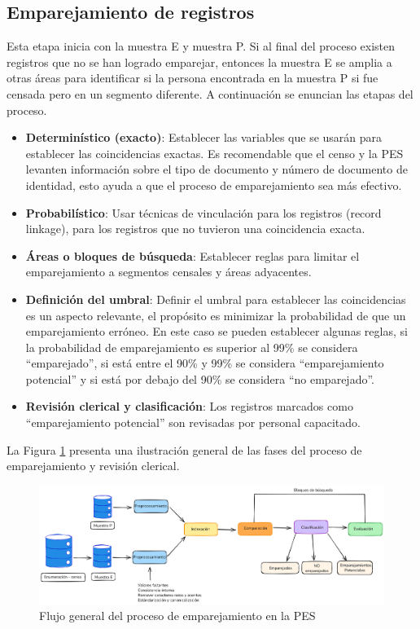 \documentclass[
  12pt,
]{book}
\providecommand{\tightlist}{%
  \setlength{\itemsep}{0pt}\setlength{\parskip}{0pt}}
\begin{document}
\subsection{Emparejamiento de registros}\label{emparejamiento-de-registros}

Esta etapa inicia con la muestra E y muestra P. Si al final del proceso existen registros que no se han logrado emparejar, entonces la muestra E se amplia a otras áreas para identificar si la persona encontrada en la muestra P si fue censada pero en un segmento diferente. A continuación se enuncian las etapas del proceso.

\begin{itemize}
\tightlist
\item
  \textbf{Determinístico (exacto)}: Establecer las variables que se usarán para establecer las coincidencias exactas. Es recomendable que el censo y la PES levanten información sobre el tipo de documento y número de documento de identidad, esto ayuda a que el proceso de emparejamiento sea más efectivo.
\item
  \textbf{Probabilístico}: Usar técnicas de vinculación para los registros (record linkage), para los registros que no tuvieron una coincidencia exacta.
\item
  \textbf{Áreas o bloques de búsqueda}: Establecer reglas para limitar el emparejamiento a segmentos censales y áreas adyacentes.
\item
  \textbf{Definición del umbral}: Definir el umbral para establecer las coincidencias es un aspecto relevante, el propósito es minimizar la probabilidad de que un emparejamiento erróneo. En este caso se pueden establecer algunas reglas, si la probabilidad de emparejamiento es superior al 99\% se considera ``emparejado'', si está entre el 90\% y 99\% se considera ``emparejamiento potencial'' y si está por debajo del 90\% se considera ``no emparejado''.
\item
  \textbf{Revisión clerical y clasificación}: Los registros marcados como ``emparejamiento potencial'' son revisadas por personal capacitado.
\end{itemize}

La Figura \ref{fig:match} presenta una ilustración general de las fases del proceso de emparejamiento y revisión clerical.

\begin{figure}

{\centering \includegraphics[width=1\linewidth]{images/FlujoMatch} 

}

\caption{Flujo general del proceso de emparejamiento en la PES}\label{fig:match}
\end{figure}
\end{document}
